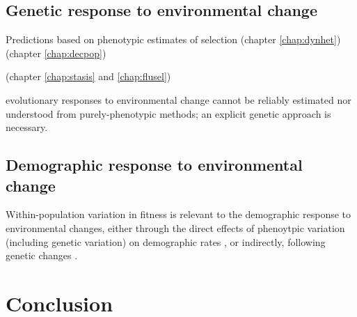 \subsection{Genetic response to environmental change}
Predictions based on phenotypic estimates of selection
(chapter \ref{chap:dynhet})
(chapter \ref{chap:decpop})


(chapter \ref{chap:stasis} and \ref{chap:flusel})

evolutionary responses to environmental change cannot be reliably estimated nor understood from purely-phenotypic methods; an explicit genetic approach is necessary. 

\subsection{Demographic response to environmental change}
Within-population variation in fitness is relevant to the demographic response to environmental changes, either through the direct effects of phenoytpic variation (including genetic variation) on demographic rates \parencite{Kendall2011, vindenes2015, Plard2016}, or indirectly, following genetic changes \parencite{Chevin2010a, Turcotte2011, Schiffers2013a}. 

\section{Conclusion}


\printbibliography[heading=subbibliography]

